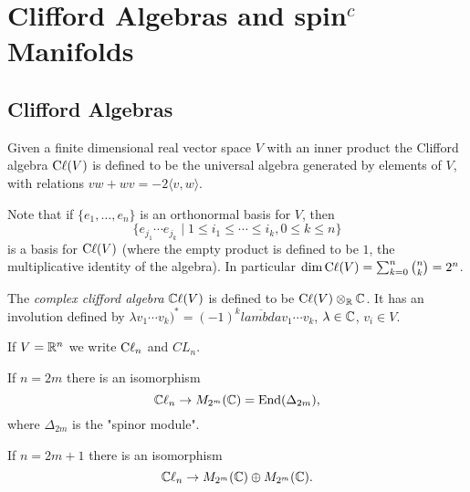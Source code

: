 
\section{Clifford Algebras and spin$^c$ Manifolds}
\subsection{Clifford Algebras}
\begin{definition}
 Given a finite dimensional real vector space $V$ with an inner product the Clifford algebra $\mathrm{C}\ell(V)$ is defined to be the universal algebra generated by elements of $V$, with relations $vw+wv=-2\langle v,w\rangle$.
\end{definition}

\noindent Note that if $\{e_1,\ldots,e_n\}$ is an orthonormal basis for $V$, then $$\{e_{j_1}\cdots e_{j_k}\mid 1\leq i_1\leq\cdots\leq i_k,0\leq k\leq n\}$$ is a basis for $\mathrm{C}\ell(V)$ (where the empty product is defined to be $1$, the multiplicative identity of the algebra). In particular $\dim\mathrm{C}\ell(V)=\sum_{k=0}^n \binom{n}{k} = 2^n$.

\begin{definition}
 The \emph{complex clifford algebra} $\mathbb{C}\ell(V)$ is defined to be $\mathrm{C}\ell(V)\otimes_{\mathbb{R}}\mathbb{C}$. It has an involution defined by $\lambda v_1\cdots v_k)^\ast=(-1)^k\overline{lambda} v_1\cdots v_k$, $\lambda\in\mathbb{C}$, $v_i\in V$.
\end{definition}

\noindent If $V=\mathbb{R}^n$ we write $\mathrm{C}\ell_n$ and $CL_n$.
\begin{fact} If $n=2m$ there is an isomorphism
$$\mathbb{C}\ell_n\to M_{2^m}(\mathbb{C})=\mathrm{End}(\Delta_{2m}),$$ where $\Delta_{2m}$ is the "spinor module".

\noindent If $n=2m+1$ there is an isomorphism $$\mathbb{C}\ell_n\to M_{2^m}(\mathbb{C})\oplus M_{2^m}(\mathbb{C}).$$
 \end{fact}



